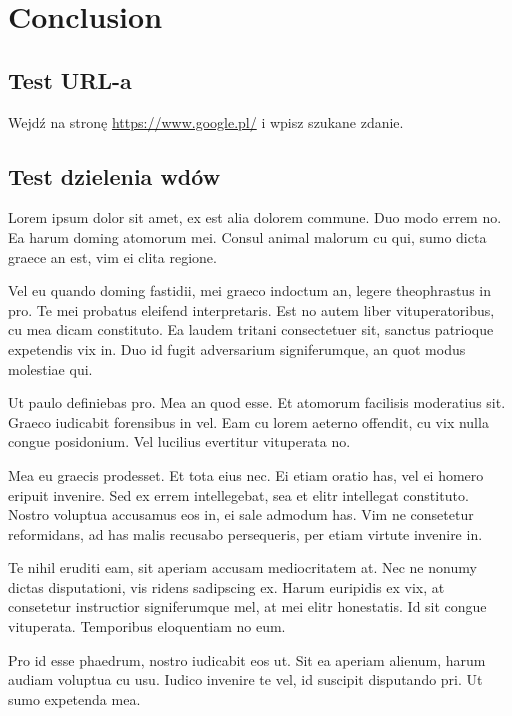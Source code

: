 \chapter{Conclusion}



\section{Test URL-a}

Wejdź na stronę \url{https://www.google.pl/} i wpisz szukane zdanie.

\clearpage

\section{Test dzielenia wdów}

Lorem ipsum dolor sit amet, ex est alia dolorem commune. Duo modo errem no. Ea harum doming atomorum mei. Consul animal malorum cu qui, sumo dicta graece an est, vim ei clita regione.

Vel eu quando doming fastidii, mei graeco indoctum an, legere theophrastus in pro. Te mei probatus eleifend interpretaris. Est no autem liber vituperatoribus, cu mea dicam constituto. Ea laudem tritani consectetuer sit, sanctus patrioque expetendis vix in. Duo id fugit adversarium signiferumque, an quot modus molestiae qui.

Ut paulo definiebas pro. Mea an quod esse. Et atomorum facilisis moderatius sit. Graeco iudicabit forensibus in vel. Eam cu lorem aeterno offendit, cu vix nulla congue posidonium. Vel lucilius evertitur vituperata no.

Mea eu graecis prodesset. Et tota eius nec. Ei etiam oratio has, vel ei homero eripuit invenire. Sed ex errem intellegebat, sea et elitr intellegat constituto. Nostro voluptua accusamus eos in, ei sale admodum has. Vim ne consetetur reformidans, ad has malis recusabo persequeris, per etiam virtute invenire in.

Te nihil eruditi eam, sit aperiam accusam mediocritatem at. Nec ne nonumy dictas disputationi, vis ridens sadipscing ex. Harum euripidis ex vix, at consetetur instructior signiferumque mel, at mei elitr honestatis. Id sit congue vituperata. Temporibus eloquentiam no eum.

Pro id esse phaedrum, nostro iudicabit eos ut. Sit ea aperiam alienum, harum audiam voluptua cu usu. Iudico invenire te vel, id suscipit disputando pri. Ut sumo expetenda mea.


